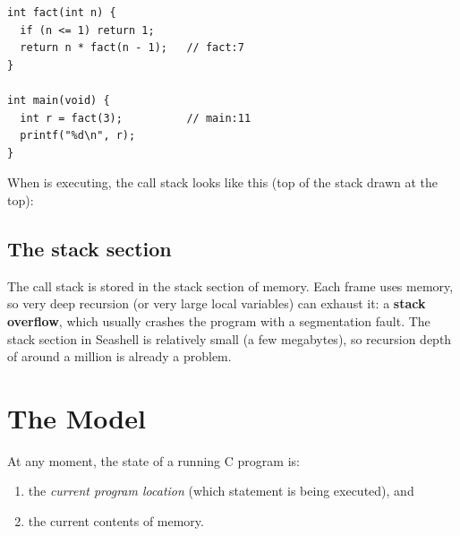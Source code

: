 \begin{example}
\begin{lstlisting}[style=c]
int fact(int n) {
  if (n <= 1) return 1;
  return n * fact(n - 1);   // fact:7
}

int main(void) {
  int r = fact(3);          // main:11
  printf("%d\n", r);
}
\end{lstlisting}
When  is executing, the call stack looks like this (top of the stack drawn at the
top):
\begin{center}
\end{center}
\end{example}

\subsection{The stack section}

The call stack is stored in the stack section of memory. Each frame uses memory, so very deep
recursion (or very large local variables) can exhaust it: a \textbf{stack overflow}, which usually
crashes the program with a segmentation fault. The stack section in Seashell is relatively small
(a few megabytes), so recursion depth of around a million is already a problem.

\section{The Model}

At any moment, the state of a running C program is:
\begin{enumerate}
  \item the \emph{current program location} (which statement is being executed), and
  \item the current contents of memory.
\end{enumerate}

